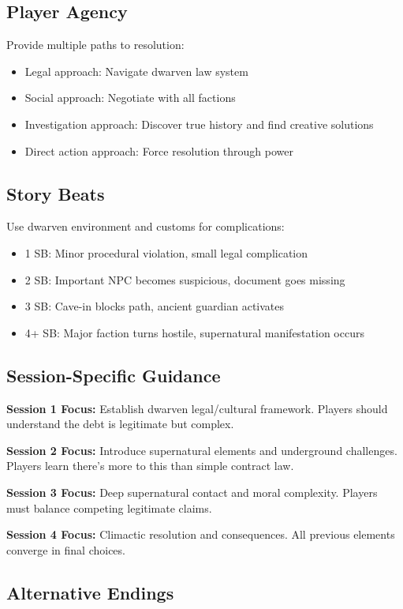 \documentclass[11pt]{article}
\begin{document}
\subsection{Player Agency}
Provide multiple paths to resolution:
\begin{itemize}
\item Legal approach: Navigate dwarven law system
\item Social approach: Negotiate with all factions
\item Investigation approach: Discover true history and find creative solutions
\item Direct action approach: Force resolution through power
\end{itemize}

\subsection{Story Beats}
Use dwarven environment and customs for complications:
\begin{itemize}
\item 1 SB: Minor procedural violation, small legal complication
\item 2 SB: Important NPC becomes suspicious, document goes missing
\item 3 SB: Cave-in blocks path, ancient guardian activates
\item 4+ SB: Major faction turns hostile, supernatural manifestation occurs
\end{itemize}

\subsection{Session-Specific Guidance}

\textbf{Session 1 Focus:} Establish dwarven legal/cultural framework. Players should understand the debt is legitimate but complex.

\textbf{Session 2 Focus:} Introduce supernatural elements and underground challenges. Players learn there's more to this than simple contract law.

\textbf{Session 3 Focus:} Deep supernatural contact and moral complexity. Players must balance competing legitimate claims.

\textbf{Session 4 Focus:} Climactic resolution and consequences. All previous elements converge in final choices.

\subsection{Alternative Endings}
\end{document}
